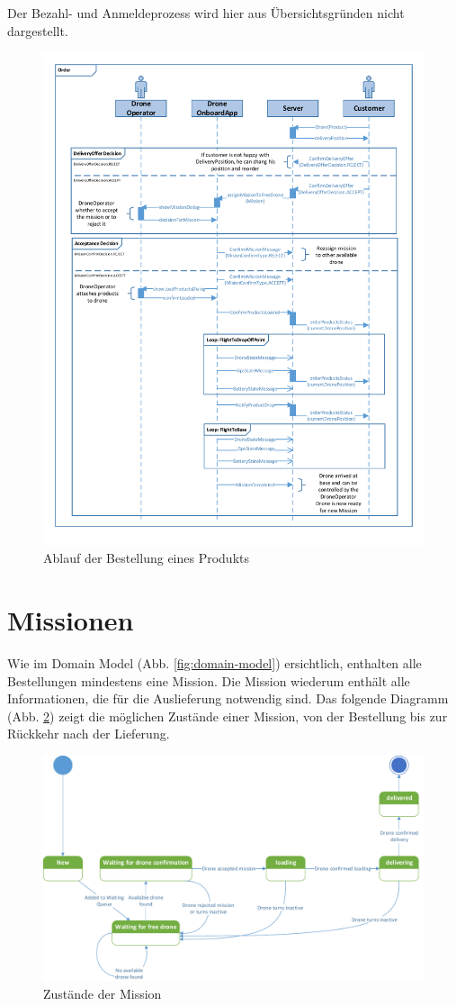 Der Bezahl- und Anmeldeprozess wird hier aus Übersichtsgründen nicht dargestellt.
\begin{figure}[H]
	\centering
	\includegraphics[height=1.0\textheight]{images/sequence_diagram.pdf}
	\caption{Ablauf der Bestellung eines Produkts}
	\label{fig:registerDrone}
\end{figure}

\section{Missionen}

Wie im Domain Model (Abb. \ref{fig:domain-model}) ersichtlich, enthalten alle Bestellungen mindestens eine Mission. Die Mission wiederum enthält alle Informationen, die für die Auslieferung notwendig sind. Das folgende Diagramm (Abb. \ref{fig:mission-state}) zeigt die möglichen Zustände einer Mission, von der Bestellung bis zur Rückkehr nach der Lieferung.

\begin{figure}[h]
	\centering
	\includegraphics[width=1.0\textwidth]{images/mission-state-flow-diagram.pdf}
	\caption{Zustände der Mission}
	\label{fig:mission-state}
\end{figure}